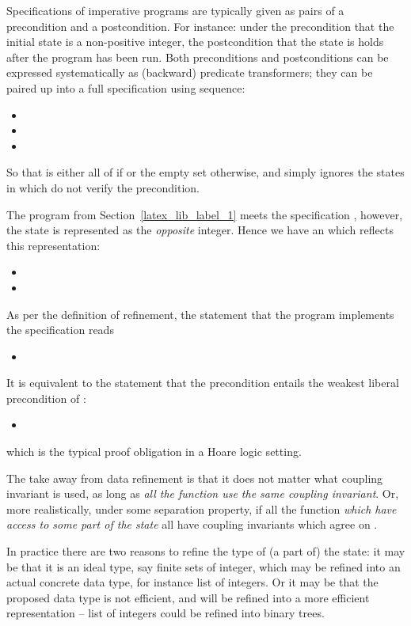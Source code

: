 \documentclass[]{llncs}
\begin{document}
\begin{example}
    Specifications of imperative programs are typically given as pairs of a precondition and a postcondition. For instance: under the precondition that the initial state is a non-positive integer, the postcondition that the state is  holds after the program has been run. Both preconditions and postconditions can be expressed systematically as (backward) predicate transformers; they can be paired up into a full specification using sequence:
    \begin{itemize}
      \item 
      \item 
      \item 
    \end{itemize}
    So that  is either all of  if  or the empty set otherwise, and  simply ignores the states in  which do not verify the precondition.
\par
The program  from Section~\ref{latex_lib_label_1} meets the specification , however, the state is represented as the \emph{opposite} integer. Hence we have an  which reflects this representation:
    \begin{itemize}
      \item 
      \item 
    \end{itemize}
    As per the definition of refinement, the statement that the program  implements the specification reads
    \begin{itemize}
      \item 
    \end{itemize}
    It is equivalent to the statement that the precondition entails the weakest liberal precondition of :
    \begin{itemize}
      \item 
    \end{itemize}
    which is the typical proof obligation in a Hoare logic setting.
\par
The take away from data refinement is that it does not matter what coupling invariant is used, as long as \emph{all the function use the same coupling invariant}. Or, more realistically, under some separation property, if all the function \emph{which have access to some part  of the state} all have coupling invariants which agree on .
\par
In practice there are two reasons to refine the type of (a part of) the state: it may be that it is an ideal type, say finite sets of integer, which may be refined into an actual concrete data type, for instance list of integers. Or it may be that the proposed data type is not efficient, and will be refined into a more efficient representation -- list of integers could be refined into binary trees.
  \end{example}
\par
\par
\end{document}
